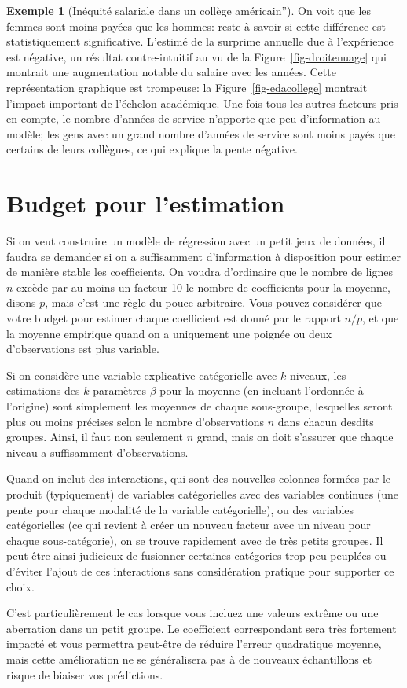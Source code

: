 \documentclass[
  11pt,
  letterpaper,
]{scrbook}
\theoremstyle{definition}
\newtheorem{example}{Exemple}[chapter]
\theoremstyle{remark}
\begin{document}
\begin{example}[Inéquité salariale dans un collège
américain'']
On voit que les femmes sont moins payées que les hommes: reste à savoir
si cette différence est statistiquement significative. L'estimé de la
surprime annuelle due à l'expérience est négative, un résultat
contre-intuitif au vu de la Figure~\ref{fig-droitenuage} qui montrait
une augmentation notable du salaire avec les années. Cette
représentation graphique est trompeuse: la Figure~\ref{fig-edacollege}
montrait l'impact important de l'échelon académique. Une fois tous les
autres facteurs pris en compte, le nombre d'années de service n'apporte
que peu d'information au modèle; les gens avec un grand nombre d'années
de service sont moins payés que certains de leurs collègues, ce qui
explique la pente négative.

\end{example}

\hypertarget{budget-pour-lestimation}{%
\section{Budget pour l'estimation}\label{budget-pour-lestimation}}

Si on veut construire un modèle de régression avec un petit jeux de
données, il faudra se demander si on a suffisamment d'information à
disposition pour estimer de manière stable les coefficients. On voudra
d'ordinaire que le nombre de lignes \(n\) excède par au moins un facteur
10 le nombre de coefficients pour la moyenne, disons \(p\), mais c'est
une règle du pouce arbitraire. Vous pouvez considérer que votre budget
pour estimer chaque coefficient est donné par le rapport \(n/p\), et que
la moyenne empirique quand on a uniquement une poignée ou deux
d'observations est plus variable.

Si on considère une variable explicative catégorielle avec \(k\)
niveaux, les estimations des \(k\) paramètres \(\beta\) pour la moyenne
(en incluant l'ordonnée à l'origine) sont simplement les moyennes de
chaque sous-groupe, lesquelles seront plus ou moins précises selon le
nombre d'observations \(n\) dans chacun desdits groupes. Ainsi, il faut
non seulement \(n\) grand, mais on doit s'assurer que chaque niveau a
suffisamment d'observations.

Quand on inclut des interactions, qui sont des nouvelles colonnes
formées par le produit (typiquement) de variables catégorielles avec des
variables continues (une pente pour chaque modalité de la variable
catégorielle), ou des variables catégorielles (ce qui revient à créer un
nouveau facteur avec un niveau pour chaque sous-catégorie), on se trouve
rapidement avec de très petits groupes. Il peut être ainsi judicieux de
fusionner certaines catégories trop peu peuplées ou d'éviter l'ajout de
ces interactions sans considération pratique pour supporter ce choix.

C'est particulièrement le cas lorsque vous incluez une valeurs extrême
ou une aberration dans un petit groupe. Le coefficient correspondant
sera très fortement impacté et vous permettra peut-être de réduire
l'erreur quadratique moyenne, mais cette amélioration ne se généralisera
pas à de nouveaux échantillons et risque de biaiser vos prédictions.


\backmatter
\end{document}
